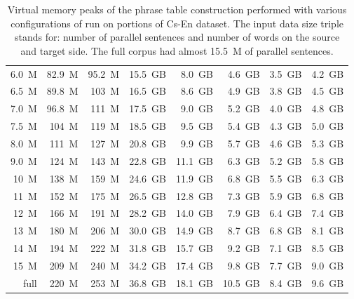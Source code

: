 \begin{table}[!htb]
\begin{tabular}{ | r  r  r | r  r  r  r  r | }
6.0~M & 82.9~M & 95.2~M & 15.5~GB & 8.0~GB & 4.6~GB & 3.5~GB & 4.2~GB \\
6.5~M & 89.8~M & 103~M & 16.5~GB & 8.6~GB & 4.9~GB & 3.8~GB & 4.5~GB \\
7.0~M & 96.8~M & 111~M & 17.5~GB & 9.0~GB & 5.2~GB & 4.0~GB & 4.8~GB \\
7.5~M & 104~M & 119~M & 18.5~GB & 9.5~GB & 5.4~GB & 4.3~GB & 5.0~GB \\
8.0~M & 111~M & 127~M & 20.8~GB & 9.9~GB & 5.7~GB & 4.6~GB & 5.3~GB \\
9.0~M & 124~M & 143~M & 22.8~GB & 11.1~GB & 6.3~GB & 5.2~GB & 5.8~GB \\
10~M & 138~M & 159~M & 24.6~GB & 11.9~GB & 6.8~GB & 5.5~GB & 6.3~GB \\
11~M & 152~M & 175~M & 26.5~GB & 12.8~GB & 7.3~GB & 5.9~GB & 6.8~GB \\
12~M & 166~M & 191~M & 28.2~GB & 14.0~GB & 7.9~GB & 6.4~GB & 7.4~GB \\
13~M & 180~M & 206~M & 30.0~GB & 14.9~GB & 8.7~GB & 6.8~GB & 8.1~GB \\
14~M & 194~M & 222~M & 31.8~GB & 15.7~GB & 9.2~GB & 7.1~GB & 8.5~GB \\
15~M & 209~M & 240~M & 34.2~GB & 17.4~GB & 9.8~GB & 7.7~GB & 9.0~GB \\
full & 220~M & 253~M & 36.8~GB & 18.1~GB & 10.5~GB & 8.4~GB & 9.6~GB \\
\hline
\end{tabular}
\caption{\label{cs-en-memory-benchmarking}
Virtual memory peaks of the phrase table construction performed with
various configurations of \eppex{} run on portions of Cs-En dataset.
The input data size triple stands for: number of parallel sentences and number of words on the source and target side.
The full corpus had almost 15.5~M of parallel sentences.}
\end{table}

